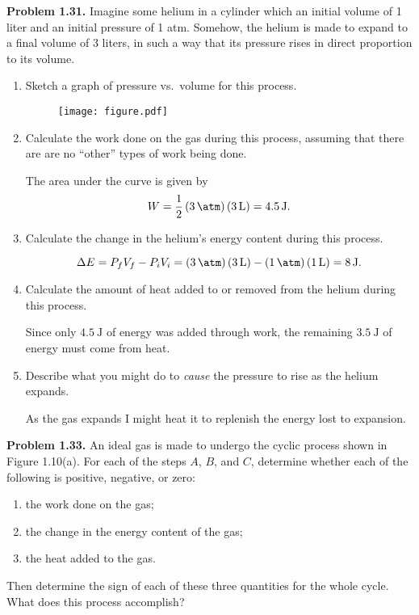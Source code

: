 \documentclass[a4paper, 12pt]{config/homework}
\begin{document}
\pagebreak\noindent
\textbf{Problem 1.31.} Imagine some helium in a cylinder which an initial volume of 1 liter and an initial pressure of 1 atm. Somehow, the helium is made to expand to a final volume of 3 liters, in such a way that its pressure rises in direct proportion to its volume.
\begin{enumerate}[label=\textbf{(\alph*)}]
\item Sketch a graph of pressure vs.\ volume for this process.

\begin{figure}[H]
\centering
\texttt{[image: figure.pdf]}
\end{figure}

\item Calculate the work done on the gas during this process, assuming that there are are no ``other'' types of work being done.

The area under the curve is given by
\[W = \frac{1}{2}\left(\qty{3}{\atm}\right)\left(\qty{3}{\liter}\right) = \qty{4.5}{\joule}.\]

\item Calculate the change in the helium's energy content during this process.

\[\Delta E = P_f V_f - P_i V_i = \left(\qty{3}{\atm}\right)\left(\qty{3}{\liter}\right) - \left(\qty{1}{\atm}\right)\left(\qty{1}{\liter}\right) = \qty{8}{\joule}.\]

\item Calculate the amount of heat added to or removed from the helium during this process.

Since only \(\qty{4.5}{\joule}\) of energy was added through work, the remaining \(\qty{3.5}{\joule}\) of energy must come from heat.

\item Describe what you might do to \textit{cause} the pressure to rise as the helium expands.

As the gas expands I might heat it to replenish the energy lost to expansion.
\end{enumerate}

\bigskip\noindent


\pagebreak\noindent
\textbf{Problem 1.33.} An ideal gas is made to undergo the cyclic process shown in Figure 1.10(a). For each of the steps \(A\), \(B\), and \(C\), determine whether each of the following is positive, negative, or zero:
\begin{enumerate}[label=(\alph*)]
\item the work done on the gas;
\item the change in the energy content of the gas;
\item the heat added to the gas.
\end{enumerate}
Then determine the sign of each of these three quantities for the whole cycle. What does this process accomplish?
\end{document}
